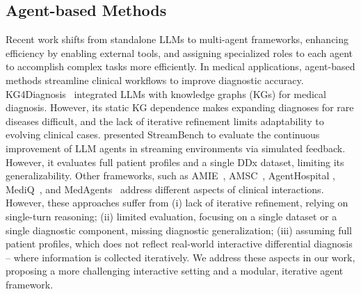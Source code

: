\subsection{Agent-based Methods}
Recent work shifts from standalone LLMs to multi-agent frameworks, enhancing efficiency by enabling external tools, and assigning specialized roles to each agent to accomplish complex tasks more efficiently. In medical applications, agent-based methods streamline clinical workflows to improve diagnostic accuracy. KG4Diagnosis~\citep{zuo2024kg4diagnosis} integrated LLMs with knowledge graphs (KGs) for medical diagnosis. However, its static KG dependence makes expanding diagnoses for rare diseases difficult, and the lack of iterative refinement limits adaptability to evolving clinical cases. \citet{wu2024streambench} presented StreamBench to evaluate the continuous improvement of LLM agents in streaming environments via simulated feedback. However, it evaluates full patient profiles and a single DDx dataset, limiting its generalizability.
Other frameworks, such as AMIE~\citep{tu2024towards}, AMSC~\cite{wang2024beyond}, AgentHospital \cite{li2024agent}, MediQ~\cite{li2024mediq}, and MedAgents~\citep{tang-etal-2024-medagents} address different aspects of clinical interactions. However, these approaches suffer from (i) lack of iterative refinement, relying on single-turn reasoning; (ii) limited evaluation, focusing on a single dataset or a single diagnostic component, missing diagnostic generalization; (iii) assuming full patient profiles, which does not reflect real-world interactive differential diagnosis -- where information is collected iteratively. We address these aspects in our work, proposing a more challenging interactive setting and a modular, iterative agent framework. 
\vspace{-0.5em}